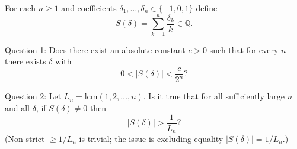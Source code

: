 For each $n\ge 1$ and coefficients $\delta_1,\dots,\delta_n\in\{-1,0,1\}$ define
\[S(\delta)=\sum_{k=1}^n \frac{\delta_k}{k}\in\mathbb{Q}.\]

Question 1: Does there exist an absolute constant $c>0$ such that for every $n$ there exists $\delta$ with
\[0<|S(\delta)|<\frac{c}{2^n}?\]

Question 2: Let $L_n=\mathrm{lcm}(1,2,\dots,n)$. Is it true that for all sufficiently large $n$ and all $\delta$,
if $S(\delta)\ne 0$ then
\[|S(\delta)|>\frac{1}{L_n}?\]
(Non-strict $\ge 1/L_n$ is trivial; the issue is excluding equality $|S(\delta)|=1/L_n$.)
